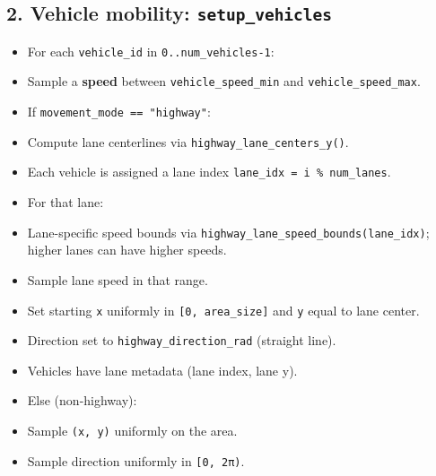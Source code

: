 \documentclass[conference]{IEEEtran}
\begin{document}
\subsection{2. Vehicle mobility: \texttt{setup_vehicles}}
\begin{itemize}
\item For each \texttt{vehicle\_id} in \texttt{0..num\_vehicles-1}:
\item Sample a \textbf{speed} between \texttt{vehicle\_speed\_min} and \texttt{vehicle\_speed\_max}.
\item If \texttt{movement\_mode == "highway"}:
\item Compute lane centerlines via \texttt{highway\_lane\_centers\_y()}.
\item Each vehicle is assigned a lane index \texttt{lane\_idx = i \% num\_lanes}.
\item For that lane:
\item Lane-specific speed bounds via \texttt{highway\_lane\_speed\_bounds(lane\_idx)}; higher lanes can have higher speeds.
\item Sample lane speed in that range.
\item Set starting \texttt{x} uniformly in \texttt{[0, area\_size]} and \texttt{y} equal to lane center.
\item Direction set to \texttt{highway\_direction\_rad} (straight line).
\item Vehicles have lane metadata (lane index, lane y).
\item Else (non-highway):
\item Sample \texttt{(x, y)} uniformly on the area.
\item Sample direction uniformly in \texttt{[0, 2π)}.
\end{itemize}
\end{document}
